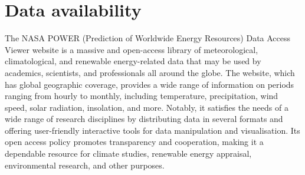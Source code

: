 \documentclass[a4paper,fleqn]{cas-sc}
\begin{document}
\section*{Data availability}
The NASA POWER (Prediction of Worldwide Energy Resources) Data Access Viewer website is a massive and open-access library of meteorological, climatological, and renewable energy-related data that may be used by academics, scientists, and professionals all around the globe. The website, which has global geographic coverage, provides a wide range of information on periods ranging from hourly to monthly, including temperature, precipitation, wind speed, solar radiation, insolation, and more. Notably, it satisfies the needs of a wide range of research disciplines by distributing data in several formats and offering user-friendly interactive tools for data manipulation and visualisation. Its open access policy promotes transparency and cooperation, making it a dependable resource for climate studies, renewable energy appraisal, environmental research, and other purposes.

\label{}

\end{document}
